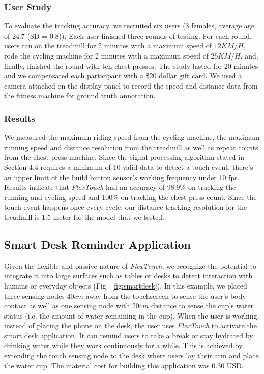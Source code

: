 \subsubsection{User Study}
To evaluate the tracking accuracy, we recruited six users (3 females, average age of 24.7 (SD = 0.8)). Each user finished three rounds of testing. For each round, users ran on the treadmill for 2 minutes with a maximum speed of $12KM/H$, rode the cycling machine for 2 minutes with a maximum speed of $25KM/H$, and, finally, finished the round with ten chest presses. The study lasted for 20 minutes and we compensated each participant with a \$20 dollar gift card. We used a camera attached on the display panel to record the speed and distance data from the fitness machine for ground truth annotation.

\subsubsection{Results}
We measured the maximum riding speed from the cycling machine, the maximum running speed and distance resolution from the treadmill as well as repeat counts from the chest-press machine. Since the signal processing algorithm stated in Section $4.4$ requires a minimum of 10 valid data to detect a touch event, there's an upper limit of the build button sensor's working frequency under 10 fps. Results indicate that \textit{FlexTouch} had an accuracy of 98.9\% on tracking the running and cycling speed and 100\% on tracking the chest-press count. Since the touch event happens once every cycle, our distance tracking resolution for the treadmill is 1.5 meter for the model that we tested.

\subsection{Smart Desk Reminder Application}
Given the flexible and passive nature of \textit{FlexTouch}, we recognize the potential to integrate it into large surfaces such as tables or desks to detect interaction with humans or everyday objects (Fig ~\ref{fig:smartdesk}). In this example, we placed three sensing nodes $40 cm$ away from the touchscreen to sense the user's body contact as well as one sensing node with $20 cm$ distance to sense the cup's water status (i.e. the amount of water remaining in the cup). When the user is working, instead of placing the phone on the desk, the user uses \textit{FlexTouch} to activate the smart desk application. It can remind users to take a break or stay hydrated by drinking water while they work continuously for a while. This is achieved by extending the touch sensing node to the desk where users lay their arm and place the water cup. The material cost for building this application was 0.30 USD.


